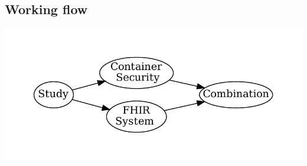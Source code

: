 \documentclass{beamer}
\begin{document}
\begin{CJK*}{UTF8}{bsmi}
    \section{Working flow}
    \begin{frame}
        \includegraphics[width=\textwidth]{../0416/methFlow.pdf}
    \end{frame}

\end{CJK*}
\end{document}
